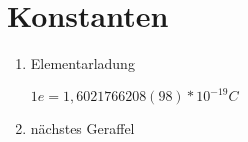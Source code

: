 \section{Konstanten}
\begin{enumerate}
\item Elementarladung \begin{flushright}$1e=1,6021766208(98)*10^{-19}C$\end{flushright}

\item nächstes Geraffel
\end{enumerate}